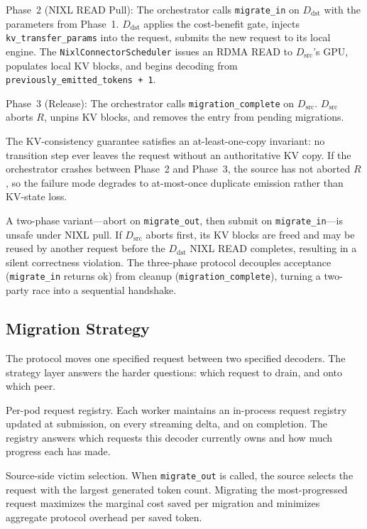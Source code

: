 \documentclass[10pt,twocolumn,letterpaper]{article}
\begin{document}
Phase~2 (NIXL READ Pull): The orchestrator calls \texttt{migrate\_in} on $D_{\text{dst}}$ with the parameters from Phase~1. $D_{\text{dst}}$ applies the cost-benefit gate, injects \texttt{kv\_transfer\_params} into the request, submits the new request to its local engine. The \texttt{NixlConnectorScheduler} issues an RDMA READ to $D_{\text{src}}$'s GPU, populates local KV blocks, and begins decoding from \texttt{previously\_emitted\_tokens~+~1}.

Phase~3 (Release): The orchestrator calls \texttt{migration\_complete} on $D_{\text{src}}$. $D_{\text{src}}$ aborts $R$, unpins KV blocks, and removes the entry from pending migrations.

The KV-consistency guarantee satisfies an at-least-one-copy invariant: no transition step ever leaves the request without an authoritative KV copy. If the orchestrator crashes between Phase~2 and Phase~3, the source has not aborted $R$, so the failure mode degrades to at-most-once duplicate emission rather than KV-state loss.

A two-phase variant---abort on \texttt{migrate\_out}, then submit on \texttt{migrate\_in}---is unsafe under NIXL pull. If $D_{\text{src}}$ aborts first, its KV blocks are freed and may be reused by another request before the $D_{\text{dst}}$ NIXL READ completes, resulting in a silent correctness violation. The three-phase protocol decouples acceptance (\texttt{migrate\_in} returns ok) from cleanup (\texttt{migration\_complete}), turning a two-party race into a sequential handshake.

\subsection{Migration Strategy}
\label{sec:mig-strategy}

The protocol moves one specified request between two specified decoders. The strategy layer answers the harder questions: which request to drain, and onto which peer.

Per-pod request registry. Each worker maintains an in-process request registry updated at submission, on every streaming delta, and on completion. The registry answers which requests this decoder currently owns and how much progress each has made.

Source-side victim selection. When \texttt{migrate\_out} is called, the source selects the request with the largest generated token count. Migrating the most-progressed request maximizes the marginal cost saved per migration and minimizes aggregate protocol overhead per saved token.
\end{document}
